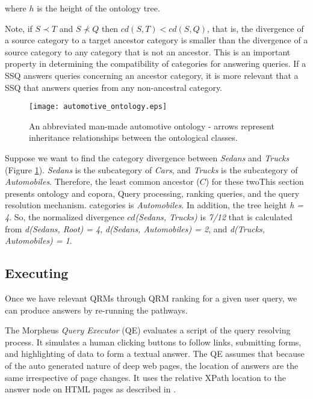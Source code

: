 \noindent where $h$ is the height of the ontology tree.

Note, if $S \prec T$ and $S \not\prec Q$ then $cd(S,T) <
cd(S,Q)$, that is, the divergence of a source category to a target
ancestor category is smaller than the divergence of a source category to any
category that is not an ancestor. This is an important property in
determining the compatibility of categories for answering queries.  If a
SSQ answers queries concerning an ancestor category, it is more relevant
that a SSQ that answers queries from any non-ancestral category.

\begin{figure}[t]
	\centering
\texttt{[image: automotive\_ontology.eps]}
\caption{An abbreviated man-made automotive ontology - arrows represent inheritance relationships between the ontological classes.}
\label{fig:automotive_ontology}
\end{figure}

Suppose we want to find the category divergence between \textit{Sedans}
and \textit{Trucks} (Figure \ref{fig:automotive_ontology}). 
\textit{Sedans} is the subcategory of \textit{Cars}, and \textit{Trucks}
is the subcategory of \textit{Automobiles}. Therefore, the least common ancestor ($C$)
for these twoThis section presents ontology and copora, Query processing, ranking queries, and the query resolution mechanism. categories is \textit{Automobiles}. In addition, the tree height \textit{h = 4}.
So, the normalized divergence $cd$\textit{(Sedans, Trucks)} is \textit{7/12}
that is calculated from \textit{d(Sedans, Root) = 4}, \textit{d(Sedans, Automobiles) = 2}, and \textit{d(Trucks, Automobiles) = 1}.


\subsection{Executing} 

Once we have relevant QRMs through QRM ranking for a given user query, we can produce answers by re-running the pathways.

The Morpheus \emph{Query Executor} (QE) evaluates a script of the query resolving process.  It simulates a human clicking buttons to follow links, submitting forms, and highlighting of data to form a textual answer.  The QE assumes that because of the auto generated nature of deep web pages, the location of answers are the same irrespective of page changes.  It uses the relative XPath location to the answer node on HTML pages as described in \cite{Badica06}.


